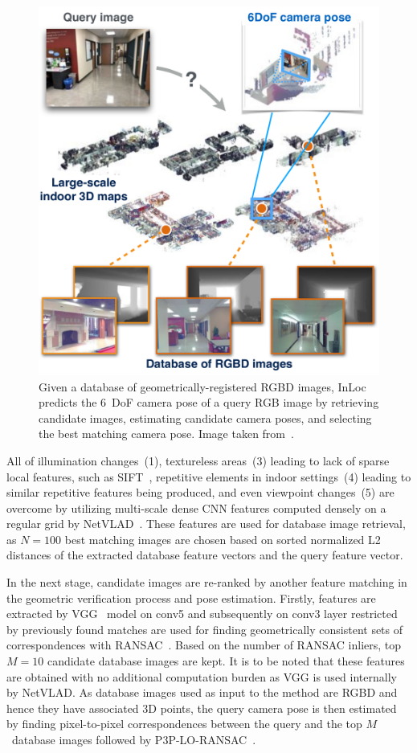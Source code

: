 \begin{figure}
    \centering
    \includegraphics[width=.5\textwidth]{../graphics/inloc.png}
    \caption[InLoc explained]{Given a database of geometrically-registered RGBD images, InLoc predicts
    the 6~DoF camera pose of a query RGB image by retrieving candidate images, estimating candidate camera poses, and selecting
    the best matching camera pose. Image taken from~\citet{InLoc}.}\label{fig:inloc_intro}
\end{figure}

All of illumination changes~(1), textureless areas~(3) leading to lack of sparse local features, such as SIFT~\citep{SIFT},
repetitive elements in indoor settings~(4) leading to similar repetitive features being produced, and even viewpoint changes~(5)
are overcome by utilizing multi-scale dense CNN features computed densely on a regular grid by NetVLAD~\citep{NetVLAD}.
These features are used for database image retrieval, as $N=100$ best matching images are chosen based on sorted
normalized L2 distances of the extracted database feature vectors and the query feature vector.

In the next stage, candidate images are re-ranked by another feature matching in the geometric verification process and
pose estimation. Firstly, features are extracted by VGG~\citep{VGG16} model on conv5 and subsequently on conv3 layer
restricted by previously found matches are used for finding geometrically consistent sets of correspondences with
RANSAC~\citep{RANSAC}. Based on the number of RANSAC inliers, top $M = 10$ candidate database images are kept.
It is to be noted that these features are obtained with no additional computation burden as VGG is used internally
by NetVLAD. As database images used as input to the method are RGBD and hence they have associated 3D points, the
query camera pose is then estimated by finding pixel-to-pixel correspondences between the query and the top
$M$~database images followed by P3P-LO-RANSAC~\citep{P3PLORANSAC}.

